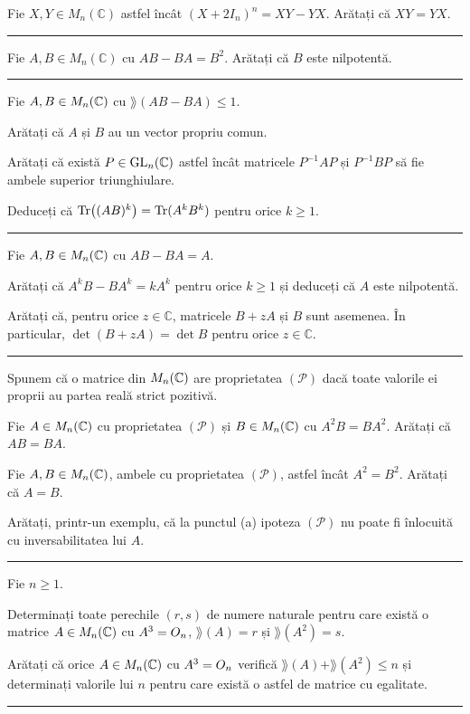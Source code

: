 Fie $X,Y\in M_n(\mathbb{C})$ astfel încât $(X+2I_n)^n=XY-YX$. Arătați că $XY=YX$.
\vspace{1mm}\hrule

Fie $A,B\in M_n(\mathbb{C})$ cu $AB-BA=B^2$. Arătați că $B$ este nilpotentă.
\vspace{1mm}\hrule

Fie $A,B\in M_n(\mathbb{C})$ cu $\rang(AB-BA)\le1$.
\begin{parti}
  \item Arătați că $A$ și $B$ au un vector propriu comun.
  \item Arătați că există $P\in\mathrm{GL}_n(\mathbb{C})$ astfel încât matricele $P^{-1}AP$ și $P^{-1}BP$ să fie ambele superior triunghiulare.
  \item Deduceți că $\operatorname{Tr}\bigl((AB)^k\bigr)=\operatorname{Tr}(A^kB^k)$ pentru orice $k\ge1$.
\end{parti}
\vspace{1mm}\hrule

Fie $A,B\in M_n(\mathbb{C})$ cu $AB-BA=A$.
\begin{parti}
  \item Arătați că $A^kB-BA^k=kA^k$ pentru orice $k\ge1$ și deduceți că $A$ este nilpotentă.
  \item Arătați că, pentru orice $z\in\mathbb{C}$, matricele $B+zA$ și $B$ sunt asemenea. În particular, $\det(B+zA)=\det B$ pentru orice $z\in\mathbb{C}$.
\end{parti}
\vspace{1mm}\hrule

Spunem că o matrice din $M_n(\mathbb{C})$ are proprietatea $(\mathcal{P})$ dacă toate valorile ei proprii au partea reală strict pozitivă.
\begin{parti}
  \item Fie $A\in M_n(\mathbb{C})$ cu proprietatea $(\mathcal{P})$ și $B\in M_n(\mathbb{C})$ cu $A^2B=BA^2$. Arătați că $AB=BA$.
  \item Fie $A,B\in M_n(\mathbb{C})$, ambele cu proprietatea $(\mathcal{P})$, astfel încât $A^2=B^2$. Arătați că $A=B$.
  \item Arătați, printr-un exemplu, că la punctul (a) ipoteza $(\mathcal{P})$ nu poate fi înlocuită cu inversabilitatea lui $A$.
\end{parti}
\vspace{1mm}\hrule

Fie $n\ge1$.
\begin{parti}
  \item Determinați toate perechile $(r,s)$ de numere naturale pentru care există o matrice $A\in M_n(\mathbb{C})$ cu $A^3=O_n$, $\rang(A)=r$ și $\rang(A^2)=s$.
  \item Arătați că orice $A\in M_n(\mathbb{C})$ cu $A^3=O_n$ verifică $\rang(A)+\rang(A^2)\le n$ și determinați valorile lui $n$ pentru care există o astfel de matrice cu egalitate.
\end{parti}
\vspace{1mm}\hrule

